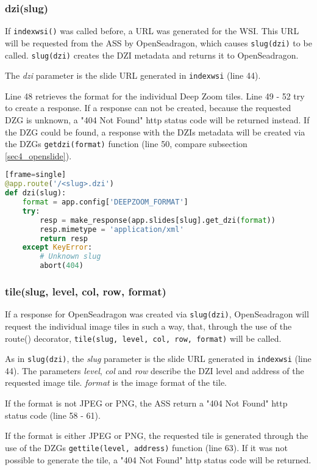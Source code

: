 \subsubsection{dzi(slug)}
If \texttt{index{\textunderscore}wsi()} was called before, a URL was generated for the WSI. This URL will be requested from the ASS by OpenSeadragon, which causes \texttt{slug(dzi)} to be called. \texttt{slug(dzi)} creates the DZI metadata and returns it to OpenSeadragon.

The \emph{dzi} parameter is the slide URL generated in \texttt{index{\textunderscore}wsi} (line 44).

Line 48 retrieves the format for the individual Deep Zoom tiles. Line 49 - 52 try to create a response. If a response can not be created, because the requested DZG is unknown, a "404 Not Found" http status code will be returned instead. If the DZG could be found, a response with the DZIs metadata will be created via the DZGs \texttt{get{\textunderscore}dzi(format)} function (line 50, compare subsection \ref{sec4_openslide}).

\begin{lstlisting}[language=Python][frame=single]
@app.route('/<slug>.dzi')
def dzi(slug):
	format = app.config['DEEPZOOM_FORMAT']
	try:
		resp = make_response(app.slides[slug].get_dzi(format))
		resp.mimetype = 'application/xml'
		return resp
	except KeyError:
		# Unknown slug
		abort(404)
\end{lstlisting}


\subsubsection{tile(slug, level, col, row, format)}
If a response for OpenSeadragon was created via \texttt{slug(dzi)}, OpenSeadragon will request the individual image tiles in such a way, that, through the use of the route() decorator, \texttt{tile(slug, level, col, row, format)} will be called.

As in \texttt{slug(dzi)}, the \emph{slug} parameter is the slide URL generated in \texttt{index{\textunderscore}wsi} (line 44). The parameters \emph{level}, \emph{col} and \emph{row} describe the DZI level and address of the requested image tile. \emph{format} is the image format of the tile.

If the format is not JPEG or PNG, the ASS return a "404 Not Found" http status code (line 58 - 61).

If the format is either JPEG or PNG, the requested tile is generated through the use of the DZGs \texttt{get{\textunderscore}tile(level, address)} function (line 63). If it was not possible to generate the tile, a "404 Not Found" http status code will be returned.

